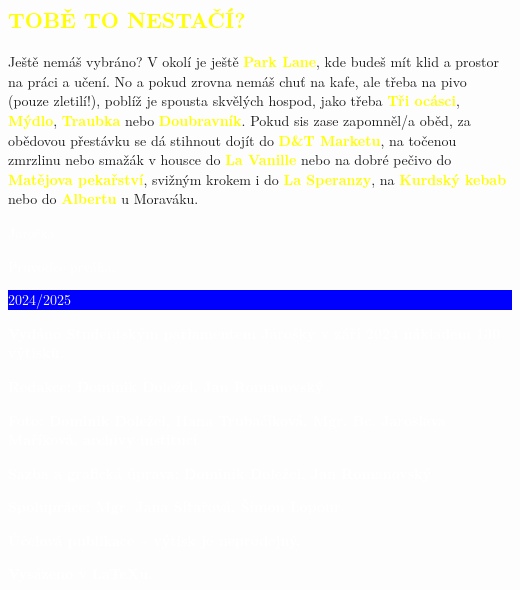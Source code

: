 \documentclass[a5paper, twoside]{article}
\newcommand{\podnadpis}[2]{
  \subsection*{\textcolor{#2}{#1}}
}
\begin{document}
\podnadpis{TOBĚ TO NESTAČÍ?}{yellow}
Ještě nemáš vybráno? V okolí je ještě \textcolor{yellow}{\textbf{Park Lane}}, kde budeš mít klid a prostor na práci a učení. No a pokud zrovna nemáš chuť na kafe, ale třeba na pivo (pouze zletilí!), poblíž je spousta skvělých hospod, jako třeba \textcolor{yellow}{\textbf{Tři ocásci}}, \textcolor{yellow}{\textbf{Mýdlo}}, \textcolor{yellow}{\textbf{Traubka}} nebo \textcolor{yellow}{\textbf{Doubravník}}. Pokud sis zase zapomněl/a oběd, za obědovou přestávku se dá stihnout dojít do \textcolor{yellow}{\textbf{D\&T Marketu}}, na točenou zmrzlinu nebo smažák v housce do \textcolor{yellow}{\textbf{La Vanille}} nebo na dobré pečivo do \textcolor{yellow}{\textbf{Matějova pekařství}}, svižným krokem i do \textcolor{yellow}{\textbf{La Speranzy}}, na \textcolor{yellow}{\textbf{Kurdský kebab}} nebo do \textcolor{yellow}{\textbf{Albertu}} u Moraváku.

\pagebreak


\pagebreak

\pagestyle{empty}
\pagecolor{red}
\noindent\hspace{-3pt}\textcolor{white}{\fontsize{20}{20} \Kapitan Jaroška}

\vspace*{\fill}


\noindent\hspace{-3pt}\textcolor{white}{\fontsize{25}{25} \Kapitan Průvodce prváka. \colorbox{blue}{\rule[5pt]{0pt}{15pt}\large 2024/2025}}

\vspace{1em}

\noindent\textcolor{white}{\textbf{Vydáno Studentským parlamentem Jarošky v září 2024 nákladem 130 výtisků.}}

\vspace{1em}

\noindent \textcolor{white}{\textbf{Redakce: Dominik Doležel, Jan Romanovský}}

\vspace{1em}

\noindent \textcolor{white}{\textbf{Foto: Dominik Doležel, Hana Trubačíková, Mgr. Bc. Jaroslava Maříková, archivy institucí}}

\vspace{1em}

\noindent \textcolor{white}{\textbf{Sazba a grafická úprava: Dominik Doležel, Jan Romanovský}}

\vspace{1em}

\noindent \textcolor{white}{\textbf{Spolupráce: Mgr. Jana Sítařová, Šimon Lopour}}

\vspace{1em}

\noindent \textcolor{white}{\textbf{Účelová publikace -- výtisk je neprodejný.}}

\vspace{1em}

\noindent \textcolor{white}{\textbf{Vysázeno v \LaTeX u.}}
\end{document}
